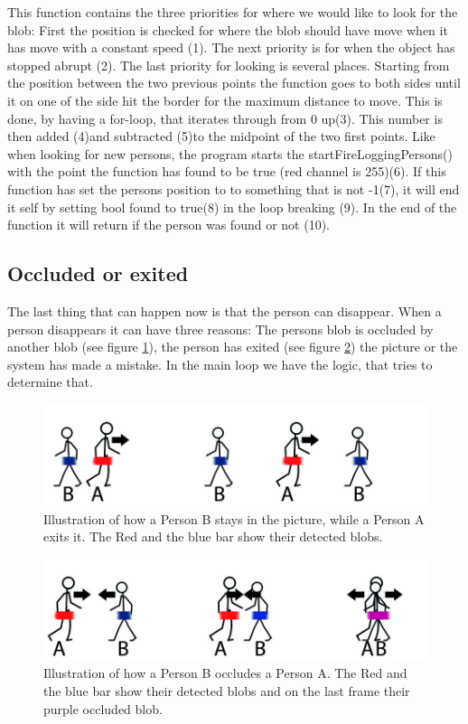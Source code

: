 This function contains the three priorities for where we would like to look for the blob: First the position is checked for where the blob should have move when it has move with a constant speed (1). The next priority is for when the object has stopped abrupt (2). The last priority for looking is several places. Starting from the position between the two previous points the function goes to both sides until it on one of the side hit the border for the maximum distance to move. This is done, by having a for-loop, that iterates through from 0 up(3). This number is then added (4)and subtracted (5)to the midpoint of the two first points. Like when looking for new persons, the program starts the startFireLoggingPersons() with the point the function has found to be true (red channel is 255)(6). If this function has set the persons position to to something that is not -1(7), it will end it self by setting bool found to true(8) in the loop breaking (9). In the end of the function it will return if the person was found or not (10).

	
	
\subsection{Occluded or exited}
The last thing that can happen now is that the person can disappear. When a person disappears it can have three reasons: The persons blob is occluded by another blob (see figure \ref{fig:enterexit}), the person has exited (see figure \ref{fig:occlusion}) the picture or the system has made a mistake. In the main loop we have the logic, that tries to determine that. 

\begin{figure}[htbp]
\centering
\includegraphics[width=1.00\textwidth]{Pictures/Design/enterexit.jpg}
\caption{Illustration of how a Person B stays in the picture, while a Person A exits it. The Red and the blue bar show their detected blobs.}
\label{fig:enterexit}
\end{figure}

\begin{figure}[htbp]
\centering
\includegraphics[width=1.00\textwidth]{Pictures/Design/occluded.jpg}
\caption{Illustration of how a Person B occludes a Person A. The Red and the blue bar show their detected blobs and on the last frame their purple occluded blob.}
\label{fig:occlusion}
\end{figure}

